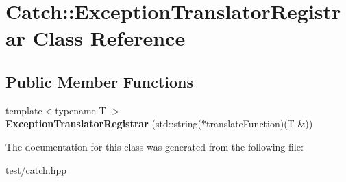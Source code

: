 \hypertarget{classCatch_1_1ExceptionTranslatorRegistrar}{}\section{Catch\+:\+:Exception\+Translator\+Registrar Class Reference}
\label{classCatch_1_1ExceptionTranslatorRegistrar}
\subsection*{Public Member Functions}
\begin{DoxyCompactItemize}
\item 
{\footnotesize template$<$typename T $>$ }\\{\bfseries Exception\+Translator\+Registrar} (std\+::string($\ast$translate\+Function)(T \&))\hypertarget{classCatch_1_1ExceptionTranslatorRegistrar_aa73229de911f26b1df6c6c87c4d9e04e}{}\label{classCatch_1_1ExceptionTranslatorRegistrar_aa73229de911f26b1df6c6c87c4d9e04e}

\end{DoxyCompactItemize}


The documentation for this class was generated from the following file\+:\begin{DoxyCompactItemize}
\item 
test/catch.\+hpp\end{DoxyCompactItemize}
